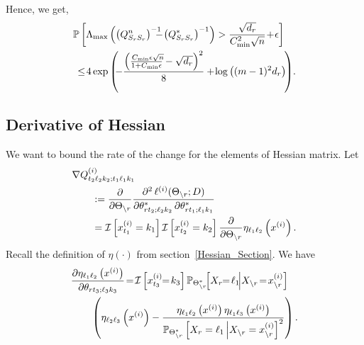 Hence, we get,
\begin{equation}
\begin{aligned}
&\mathbb{P}\left[\Lambda_{\max}\left(\left(\fisher^n_{\support_\svert\support_\svert}\right)^{-1}\!\!\!\!\! -\!\left(\fisher^*_{\support_\svert\support_\svert}\right)^{-1}\right) >\frac{\sqrt{d_\svert}}{C_{\min}^2\sqrt{n}}\!+\!\epsilon\right]\\
&\,\leq\! 4\exp\left(\!\!-\frac{\left(\frac{C_{\min}\epsilon\sqrt{n}\!\!}{1+C_{\min}\epsilon}-\sqrt{d_\svert}\right)^2}{8}+\!\log\left((m-1)^2d_\svert\right)\!\right)\!.
\end{aligned}
\label{fisher_inf_1_bound2}
\end{equation}

\subsection{Derivative of Hessian}
\label{derivative_hessian}
We want to bound the rate of the change for the elements of Hessian matrix. Let
\begin{equation}
\begin{aligned}
&\nabla Q_{t_2\ell_2k_2;t_1\ell_1k_1}^{(i)}\\
&\qquad:= \frac{\partial}{\partial\Theta_{\backslash r}}\frac{\partial^2\, \ell^{(i)}(\Theta_{\backslash r}; D)}{\partial\theta^*_{r t_2;\ell_2 k_2}\, \partial\theta^*_{r t_1;\ell_1 k_1}}\\
&\qquad=\mathcal{I}\left[x_{t_1}^{(i)}=k_1\right] \mathcal{I}\left[x_{t_2}^{(i)}=k_2\right] \frac{\partial}{\partial\Theta_{\backslash r}}\eta_{\ell_1\ell_2}\left(x^{(i)}\right).
\end{aligned}
\nonumber
\end{equation}
Recall the definition of $\eta(\cdot)$ from section~\ref{Hessian_Section}. We have
\begin{equation}
\begin{aligned}
&\frac{\partial\eta_{\ell_1\ell_2}\left(x^{(i)}\right)}{\partial\theta_{\svert t_3;\ell_3k_3}}\! =\! \I\left[x_{t_3}^{(i)}\!\!=\!k_3\right] \mathbb{P}_{\Theta^*_{\backslash\svert}}\!\! \left[X_\svert\!\! =\! \ell_1 \! \Big| X_{\backslash \svert}\! =\!
x_{\backslash \svert}^{(i)}\right]\\ &\qquad\left(\eta_{\ell_2\ell_3}\left(x^{(i)}\right)-\frac{\eta_{\ell_1\ell_2}\left(x^{(i)}\right) \eta_{\ell_1\ell_3}\left(x^{(i)}\right)} {\mathbb{P}_{\Theta^*_{\backslash\svert}} \left[X_\svert = \ell_1 \, \Big| X_{\backslash \svert} =
x_{\backslash \svert}^{(i)}\right]^2}\right).
\end{aligned}
\nonumber
\end{equation}
